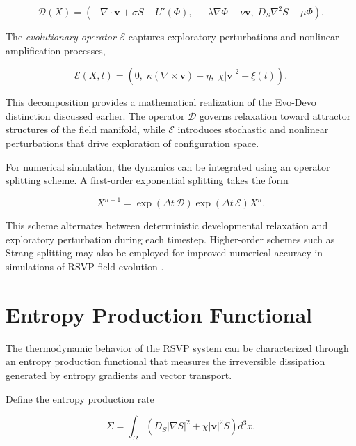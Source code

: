 \documentclass[12pt]{article}
\begin{document}
\begin{equation}
\mathcal{D}(X) =
\left(
-\nabla \cdot \mathbf{v} + \sigma S - U'(\Phi),
\;
-\lambda \nabla \Phi - \nu \mathbf{v},
\;
D_S \nabla^2 S - \mu \Phi
\right).
\label{eq:development_operator}
\end{equation}

The \emph{evolutionary operator} $\mathcal{E}$ captures exploratory perturbations and nonlinear amplification processes,

\begin{equation}
\mathcal{E}(X,t) =
\left(
0,
\;
\kappa (\nabla \times \mathbf{v}) + \eta,
\;
\chi |\mathbf{v}|^2 + \xi(t)
\right).
\label{eq:evolution_operator}
\end{equation}

This decomposition provides a mathematical realization of the Evo-Devo distinction discussed earlier. The operator $\mathcal{D}$ governs relaxation toward attractor structures of the field manifold, while $\mathcal{E}$ introduces stochastic and nonlinear perturbations that drive exploration of configuration space.

For numerical simulation, the dynamics can be integrated using an operator splitting scheme. A first-order exponential splitting takes the form

\begin{equation}
X^{n+1}
=
\exp(\Delta t\,\mathcal{D})
\exp(\Delta t\,\mathcal{E})
X^{n}.
\label{eq:splitting}
\end{equation}

This scheme alternates between deterministic developmental relaxation and exploratory perturbation during each timestep. Higher-order schemes such as Strang splitting may also be employed for improved numerical accuracy in simulations of RSVP field evolution \cite{strogatz1994}.

\section{Entropy Production Functional}
\label{sec:entropy_production}

The thermodynamic behavior of the RSVP system can be characterized through an entropy production functional that measures the irreversible dissipation generated by entropy gradients and vector transport.

Define the entropy production rate

\begin{equation}
\Sigma =
\int_{\Omega}
\left(
D_S |\nabla S|^2
+
\chi |\mathbf{v}|^2 S
\right)
d^3x .
\label{eq:entropy_production}
\end{equation}
\end{document}
